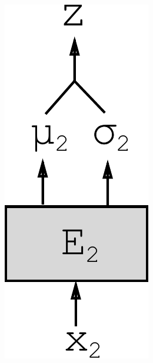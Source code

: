\documentclass{article}
\begin{document}
\begin{figure}[!h]
\begin{subfigure}[b]{.10\linewidth}
        \includegraphics[width=.75\linewidth]{modelv1}
        \caption{}
        \label{fig:diagram:modelv1}
    \end{subfigure}\hspace{5mm}
    \begin{subfigure}[b]{.15\linewidth}

\end{subfigure}
\end{figure}
\end{document}
